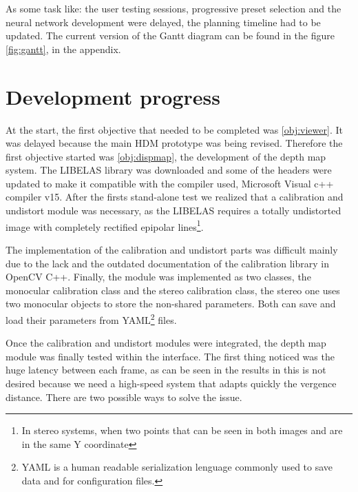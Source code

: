 \documentclass[10pt,a4paper,twocolumn,twoside]{article}
\begin{document}
	

	As some task like: the user testing sessions, progressive preset selection and the neural network development were delayed, the planning timeline had to be updated. The current version of the Gantt diagram can be found in the figure \ref{fig:gantt}, in the appendix.
	
	
	\section{Development progress}
	 
	
	At the start, the first objective that needed to be completed was \ref{obj:viewer}. It was delayed because the main HDM prototype was being revised. Therefore the first objective started was \ref{obj:dispmap}, the development of the depth map system. The LIBELAS library was downloaded and some of the headers were updated to make it compatible with the compiler used, Microsoft Visual c++ compiler v15. After the firsts stand-alone test we realized that a calibration and undistort module was necessary, as the LIBELAS requires a totally undistorted image with completely rectified epipolar lines\footnote{In stereo systems, when two points that can be seen in both images and are in the same Y coordinate}. 
	
	The implementation of the calibration and undistort parts was difficult mainly due to the lack and the outdated documentation of the calibration library in OpenCV C++. Finally, the module was implemented as two classes, the monocular calibration class and the stereo calibration class, the stereo one uses two monocular objects to store the non-shared parameters. Both can save and load their parameters from YAML\footnote{YAML is a human readable serialization lenguage commonly used to save data and for configuration files.} files.
	
	Once the calibration and undistort modules were integrated, the depth map module was finally tested within the interface. 
	The first thing noticed was the huge latency between each frame, as can be seen in the results in  this is not desired because we need a high-speed system that adapts quickly the vergence distance. There are two possible ways to solve the issue.
	
\end{document}
